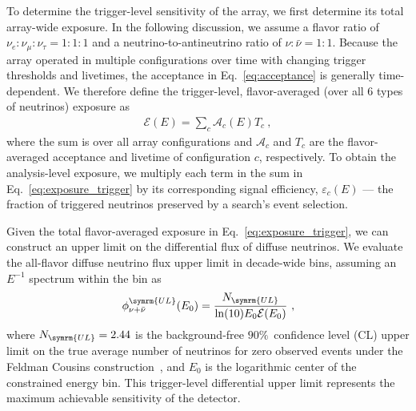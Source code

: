       To determine the trigger-level sensitivity of the array, we first determine its total array-wide exposure.
      In the following discussion, we assume a flavor ratio of $\nu_e:\nu_{\mu}:\nu_{\tau} = 1:1:1$ and a neutrino-to-antineutrino ratio of $\nu : \bar{\nu} = 1:1$.
      Because the array operated in multiple configurations over time with changing trigger thresholds and livetimes, the acceptance in Eq.~\eqref{eq:acceptance} is generally time-dependent.
      We therefore define the trigger-level, flavor-averaged (over all 6 types of neutrinos) exposure as
      \begin{align}\label{eq:exposure_trigger}
          \mathcal{E}(E) = \sum_c \mathcal{A}_c(E) T_c~,
      \end{align}
      where the sum is over all array configurations and $\mathcal{A}_c$ and $T_c$ are the flavor-averaged acceptance and livetime of configuration $c$, respectively.
      To obtain the analysis-level exposure, we multiply each term in the sum in Eq.~\eqref{eq:exposure_trigger} by its corresponding signal efficiency, $\varepsilon_c(E)$ --- the fraction of triggered neutrinos preserved by a search's event selection.

      Given the total flavor-averaged exposure in Eq.~\eqref{eq:exposure_trigger}, we can construct an upper limit on the differential flux of diffuse neutrinos.
      We evaluate the all-flavor diffuse neutrino flux upper limit in decade-wide bins, assuming an $E^{-1}$ spectrum within the bin as
      \begin{align}
          \phi^{\symrm{UL}}_{\nu+\bar{\nu}}(E_0) = \frac{N_{\symrm{UL}}}{\ln(10) E_0 \mathcal{E}(E_0)}~,
          \label{eq:phi_UL}
      \end{align}
      where $N_{\symrm{UL}}=2.44$ is the background-free $90\%$~confidence level (CL) upper limit on the true average number of neutrinos for zero observed events under the Feldman Cousins construction~\citep{feldman_cousins}, and $E_0$ is the logarithmic center of the constrained energy bin.
      This trigger-level differential upper limit represents the maximum achievable sensitivity of the detector.

